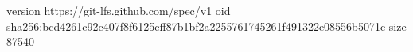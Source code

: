version https://git-lfs.github.com/spec/v1
oid sha256:bcd4261c92c407f8f6125cff87b1bf2a2255761745261f491322e08556b5071c
size 87540
